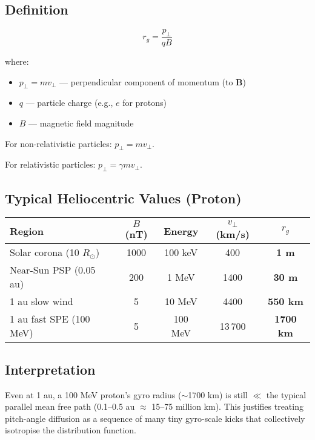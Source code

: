 {\subsection*{Definition}

\begin{tcolorbox}
\[
\boxed{r_g = \frac{p_\perp}{qB}}
\]
\end{tcolorbox}

\noindent
where:
\begin{itemize}
  \item $p_\perp = m v_\perp$ — perpendicular component of momentum (to $\mathbf{B}$)
  \item $q$ — particle charge (e.g., $e$ for protons)
  \item $B$ — magnetic field magnitude
\end{itemize}

For non-relativistic particles: $p_\perp = m v_\perp$.

For relativistic particles: $p_\perp = \gamma m v_\perp$.

\subsection*{Typical Heliocentric Values (Proton)}

\begin{center}
\begin{tabular}{@{}lcccc@{}}
\toprule
\textbf{Region} & $B$ (nT) & \textbf{Energy} & $v_\perp$ (km/s) & $r_g$ \\
\midrule
Solar corona (10 $R_\odot$) & 1000 & 100 keV   & 400   & \textbf{1 m} \\
Near-Sun PSP (0.05 au)      & 200  & 1 MeV     & 1400  & \textbf{30 m} \\
1 au slow wind              & 5    & 10 MeV    & 4400  & \textbf{550 km} \\
1 au fast SPE (100 MeV)     & 5    & 100 MeV   & 13\,700 & \textbf{1700 km} \\
\bottomrule
\end{tabular}
\end{center}

\subsection*{Interpretation}

Even at 1 au, a 100 MeV proton’s gyro radius ($\sim$1700 km) is still $\ll$ the typical parallel mean free path (0.1–0.5 au $\approx$ 15–75 million km). This justifies treating pitch-angle diffusion as a sequence of many tiny gyro-scale kicks that collectively isotropise the distribution function.


}
